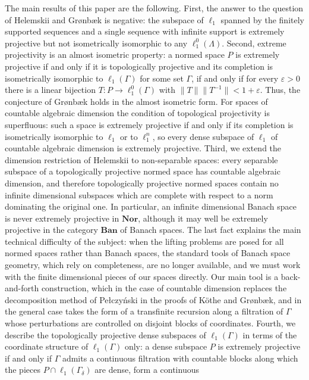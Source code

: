 \documentclass[12pt]{article}
\newcommand{\Nor}{\mathbf{Nor}}
\newcommand{\Ban}{\mathbf{Ban}}
\newcommand{\lo}[1]{\ell_1^0(#1)}
\newcommand{\ellone}[1]{\ell_1(#1)}
\newcommand{\norm}[1]{\lVert #1\rVert}
\begin{document}
The main results of this paper are the following. First, the answer to the
question of Helemskii and Gr{\o}nb{\ae}k is negative: the subspace of $\ell_1$
spanned by the finitely supported sequences and a single sequence with
infinite support is extremely projective but not isometrically isomorphic to
any $\lo{\Lambda}$. Second, extreme projectivity is an almost isometric
property: a normed space $P$ is extremely projective if and only if it is
topologically projective and its completion is isometrically isomorphic to
$\ellone{\Gamma}$ for some set $\Gamma$, if and only if for every
$\varepsilon>0$ there is a linear bijection $T:P\to\lo{\Gamma}$ with
$\norm{T}\norm{T^{-1}}<1+\varepsilon$. Thus, the conjecture of Gr{\o}nb{\ae}k
holds in the almost isometric form. For spaces of countable algebraic
dimension the condition of topological projectivity is superfluous: such a
space is extremely projective if and only if its completion is isometrically
isomorphic to $\ell_1$ or to $\ell_1^n$, so every dense subspace of $\ell_1$
of countable algebraic dimension is extremely projective. Third, we extend
the dimension restriction of Helemskii to non-separable spaces: every
separable subspace of a topologically projective normed space has countable
algebraic dimension, and therefore topologically projective normed spaces
contain no infinite dimensional subspaces which are complete with respect to
a norm dominating the original one. In particular, an infinite dimensional
Banach space is never extremely projective in $\Nor$, although it may well
be extremely projective in the category $\Ban$ of Banach spaces. The last
fact explains the main technical difficulty of the subject: when the lifting
problems are posed for all normed spaces rather than Banach spaces, the
standard tools of Banach space geometry, which rely on completeness, are no
longer available, and we must work with the finite dimensional pieces of our
spaces directly. Our main tool is a back-and-forth construction, which in the
case of countable dimension replaces the decomposition method of
Pe{\l}czy\'nski in the proofs of K\"othe and Gr{\o}nb{\ae}k, and in the
general case takes the form of a transfinite recursion along a filtration of
$\Gamma$ whose perturbations are controlled on disjoint blocks of
coordinates. Fourth, we describe the topologically projective dense
subspaces of $\ellone{\Gamma}$ in terms of the coordinate structure of
$\ellone{\Gamma}$ only: a dense subspace $P$ is extremely projective if and
only if $\Gamma$ admits a continuous filtration with countable blocks along
which the pieces $P\cap\ellone{\Gamma_\delta}$ are dense, form a continuous
\end{document}
